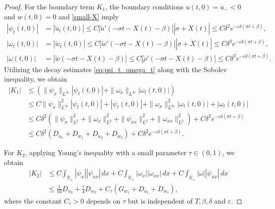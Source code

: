 \documentclass[11pt,reqno]{amsart}
\numberwithin{equation}{section} %
\begin{document}
\begin{proof}
For the boundary term $K_1$, the boundary conditions $u(t,0) = u_- < 0$ and $w(t,0) = 0$ and \eqref{small-X} imply
\begin{equation} \label{eq:psi_t_omega_t}
    \begin{aligned}
        |\psi_t(t,0)| &= |\tilde{u}_t(t,0)| \le C | \tilde{u}'(-\sigma t -X(t) -\beta)||\sigma + \dot{X}(t)|\le C \delta^2 e^{-c\delta ( \sigma t +\beta)},\\
        |\omega_t(t,0)| &= |\tilde{w}_t(t,0)| \le C | \tilde{w}'(-\sigma t -X(t) -\beta)||\sigma + \dot{X}(t)|\le C \delta^3 e^{-c\delta ( \sigma t +\beta)},\\
        |\omega(t,0)| &= |\tilde{w}(-\sigma t-X(t)-\beta)| \le C|\tilde{\rho}'(-\sigma t -X(t) -\beta)|\le C \delta^2 e^{-c\delta ( \sigma t +\beta)}.
    \end{aligned}
\end{equation}
Utilizing the decay estimates \eqref{eq:psi_t_omega_t} along with the Sobolev inequality, we obtain
\begin{equation*}
\begin{aligned}
|K_1| &\le \left( \| \psi_x\|_{L^\infty} |\psi_t(t,0)|  + \| \omega_x\|_{L^\infty} | \omega_t(t,0)|\right) \\
&\le C \|\psi_x\|_{L^\infty}^2|\psi_t(t,0)|+|\psi_t(t,0)| +\|\omega_x\|_{L^\infty}^2|\omega_t(t,0)|+ |\omega_t(t,0)|\\
&\le C  \delta^2\left( \|\psi_x\|_{L^2}^2+ \|\omega_x\|_{L^2}^2 +\|\psi_{xx}\|_{L^2}^2+\|\omega_{xx}\|_{L^2}^2 \right) + C\delta^2 e^{-c\delta(\sigma t+ \beta)} \\
&\le C \delta^2 (D_{u_1}+D_{w_1}+D_{u_2}+D_{w_2})+ C\delta^2 e^{-c\delta(\sigma t+ \beta)}.
\end{aligned}
\end{equation*}



For $K_2$, applying Young's inequality with a small parameter $\tau \in (0,1)$, we obtain
\begin{equation*}
\begin{aligned}
|K_2| &\le C \int_{\mathbb{R}_+} |\psi_x | | \psi_{xx} | \, dx + C \int_{\mathbb{R}_+} | \omega_x | | \omega_{xx} | \, dx + C \int_{\mathbb{R}_+} | \omega | | \psi_{xx} | \, dx \\
&\le \frac{1}{16} D_{u_2} + \frac{\tau}{4} D_{w_2} + C_\tau (G_{w_1} + D_{u_1} + D_{w_1}),
\end{aligned}
\end{equation*}
where the constant $C_\tau>0$ depends on $\tau$ but is independent of $T,\beta, \delta$ and $\varepsilon$.



\end{proof}
\end{document}
